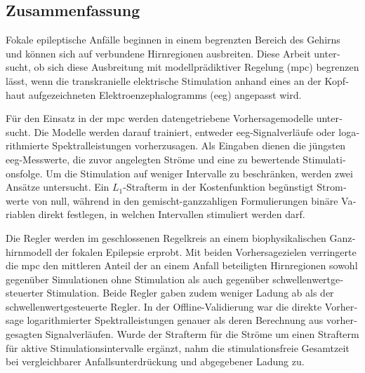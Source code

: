 \documentclass[
    english,
	ruledheaders=section,%
	class=report,%
	thesis={type=master},%
	accentcolor=2c, %
	custommargins=false,
	marginpar=false,
	BCOR=10mm, %
	parskip=half-, %
	fontsize=11pt, %
  	twoside,
  	numbers=noendperiod,
  	fleqn,
  	captions=oneline, %
	captions=tableheading, %
  	IMRAD=false
]{tudapub}
\begin{document}
\begin{otherlanguage}{ngerman}
\section*{Zusammenfassung}
Fokale epileptische Anfälle beginnen in einem begrenzten Bereich des Gehirns und können sich auf verbundene Hirnregionen ausbreiten.
Diese Arbeit untersucht, ob sich diese Ausbreitung mit modellprädiktiver Regelung (\acs*{mpc}) begrenzen lässt, wenn die transkranielle elektrische Stimulation anhand eines an der Kopfhaut aufgezeichneten Elektroenzephalogramms (\acs*{eeg}) angepasst wird.

Für den Einsatz in der \acs*{mpc} werden datengetriebene Vorhersagemodelle untersucht.
Die Modelle werden darauf trainiert, entweder \acs*{eeg}-Signalverläufe oder logarithmierte Spektralleistungen vorherzusagen.
Als Eingaben dienen die jüngsten \acs*{eeg}-Messwerte, die zuvor angelegten Ströme und eine zu bewertende Stimulationsfolge.
Um die Stimulation auf weniger Intervalle zu beschränken, werden zwei Ansätze untersucht.
Ein $L_1$-Strafterm in der Kostenfunktion begünstigt Stromwerte von null, während in den gemischt-ganzzahligen Formulierungen binäre Variablen direkt festlegen, in welchen Intervallen stimuliert werden darf.

Die Regler werden im geschlossenen Regelkreis an einem biophysikalischen Ganzhirnmodell der fokalen Epilepsie erprobt.
Mit beiden Vorhersagezielen verringerte die \acs*{mpc} den mittleren Anteil der an einem Anfall beteiligten Hirnregionen sowohl gegenüber Simulationen ohne Stimulation als auch gegenüber schwellenwertgesteuerter Stimulation.
Beide Regler gaben zudem weniger Ladung ab als der schwellenwertgesteuerte Regler.
In der Offline-Validierung war die direkte Vorhersage logarithmierter Spektralleistungen genauer als deren Berechnung aus vorhergesagten Signalverläufen.
Wurde der Strafterm für die Ströme um einen Strafterm für aktive Stimulationsintervalle ergänzt, nahm die stimulationsfreie Gesamtzeit bei vergleichbarer Anfallsunterdrückung und abgegebener Ladung zu.
\end{otherlanguage}

\cleardoublepage

\tableofcontents
\cleardoublepage



\mainmatter









\appendix


\cleardoublepage
{}
{}

\printbibliography
\end{document}
